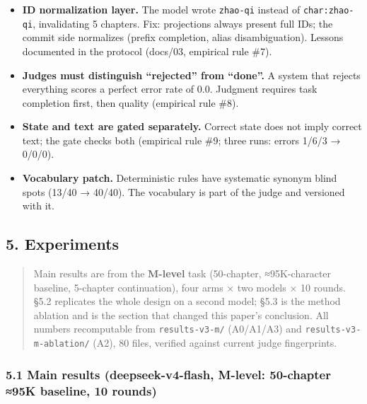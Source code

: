 \documentclass[
  english,
]{article}
\providecommand{\tightlist}{%
  \setlength{\itemsep}{0pt}\setlength{\parskip}{0pt}}
\begin{document}
\begin{itemize}
\tightlist
\item
  \textbf{ID normalization layer.} The model wrote \texttt{zhao-qi}
  instead of \texttt{char:zhao-qi}, invalidating 5 chapters. Fix:
  projections always present full IDs; the commit side normalizes
  (prefix completion, alias disambiguation). Lessons documented in the
  protocol (docs/03, empirical rule \#7).
\item
  \textbf{Judges must distinguish ``rejected'' from ``done''.} A system
  that rejects everything scores a perfect error rate of 0.0. Judgment
  requires task completion first, then quality (empirical rule \#8).
\item
  \textbf{State and text are gated separately.} Correct state does not
  imply correct text; the gate checks both (empirical rule \#9; three
  runs: errors 1/6/3 → 0/0/0).
\item
  \textbf{Vocabulary patch.} Deterministic rules have systematic synonym
  blind spots (13/40 → 40/40). The vocabulary is part of the judge and
  versioned with it.
\end{itemize}

\subsection{5. Experiments}\label{experiments}

\begin{quote}
Main results are from the \textbf{M-level} task (50-chapter,
≈95K-character baseline, 5-chapter continuation), four arms × two models
× 10 rounds. §5.2 replicates the whole design on a second model; §5.3 is
the method ablation and is the section that changed this paper's
conclusion. All numbers recomputable from \texttt{results-v3-m/}
(A0/A1/A3) and \texttt{results-v3-m-ablation/} (A2), 80 files, verified
against current judge fingerprints.
\end{quote}

\subsubsection{5.1 Main results (deepseek-v4-flash, M-level: 50-chapter
≈95K baseline, 10
rounds)}\label{main-results-deepseek-v4-flash-m-level-50-chapter-95k-baseline-10-rounds}
\end{document}
